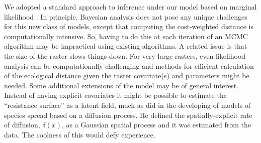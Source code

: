 \documentclass[12pt]{article}
\begin{document}
We adopted a standard approach to inference under our model based on
marginal likelihood \citep{borchers_efford:2008}. In principle,
Bayesian analysis does not pose any unique challenges for this new
class of models, except that computing the cost-weighted distance is
computationally intensive.
 So, having to do this at each iteration of an
MCMC algorithm may be impractical using existing algorithms.
A related issue is that the size of the raster slows things down. For
very large rasters, even likelihood analysis can be computationally
challenging and methods for efficient calculation of the ecological distance
given the raster covariate(s) and parameters might be needed.
Some additional extensions of the model may be of general
interest. Instead of
having explicit covariates it might be possible to estimate the
``resistance surface'' as a latent field, much as \citep{wikle:2003}
 did in the developing of models of species spread based on a
 diffusion process. He defined the spatially-explicit rate of
diffusion, $\delta(x)$, as a Gaussian spatial process and it was
estimated from the data.  The coolness of this would defy experience.














\newpage



\newpage




\end{document}

